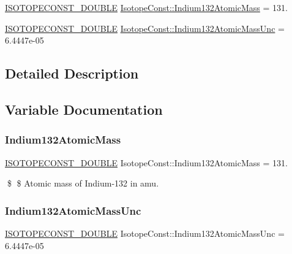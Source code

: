 \begin{DoxyCompactItemize}
\item 
\mbox{\hyperlink{group___isotope_const-_macros_ga8f45a7272ce02c0b4c65c44636ed719a}{I\+S\+O\+T\+O\+P\+E\+C\+O\+N\+S\+T\+\_\+\+D\+O\+U\+B\+LE}} \mbox{\hyperlink{group___isotope_const-_indium-_in132_gab2f0186f32ad506a227495a21a8c7c68}{Isotope\+Const\+::\+Indium132\+Atomic\+Mass}} = 131.
\item 
\mbox{\hyperlink{group___isotope_const-_macros_ga8f45a7272ce02c0b4c65c44636ed719a}{I\+S\+O\+T\+O\+P\+E\+C\+O\+N\+S\+T\+\_\+\+D\+O\+U\+B\+LE}} \mbox{\hyperlink{group___isotope_const-_indium-_in132_ga3e435e9b6d35dd054eb62e2b4a5c1ba2}{Isotope\+Const\+::\+Indium132\+Atomic\+Mass\+Unc}} = 6.\+4447e-\/05
\end{DoxyCompactItemize}


\subsection{Detailed Description}


\subsection{Variable Documentation}
\mbox{\label{group___isotope_const-_indium-_in132_gab2f0186f32ad506a227495a21a8c7c68}} 
\subsubsection{\texorpdfstring{Indium132\+Atomic\+Mass}{Indium132AtomicMass}}
{\footnotesize\ttfamily \mbox{\hyperlink{group___isotope_const-_macros_ga8f45a7272ce02c0b4c65c44636ed719a}{I\+S\+O\+T\+O\+P\+E\+C\+O\+N\+S\+T\+\_\+\+D\+O\+U\+B\+LE}} Isotope\+Const\+::\+Indium132\+Atomic\+Mass = 131.}

\$ \$ Atomic mass of Indium-\/132 in amu. \mbox{\label{group___isotope_const-_indium-_in132_ga3e435e9b6d35dd054eb62e2b4a5c1ba2}} 
\subsubsection{\texorpdfstring{Indium132\+Atomic\+Mass\+Unc}{Indium132AtomicMassUnc}}
{\footnotesize\ttfamily \mbox{\hyperlink{group___isotope_const-_macros_ga8f45a7272ce02c0b4c65c44636ed719a}{I\+S\+O\+T\+O\+P\+E\+C\+O\+N\+S\+T\+\_\+\+D\+O\+U\+B\+LE}} Isotope\+Const\+::\+Indium132\+Atomic\+Mass\+Unc = 6.\+4447e-\/05}

